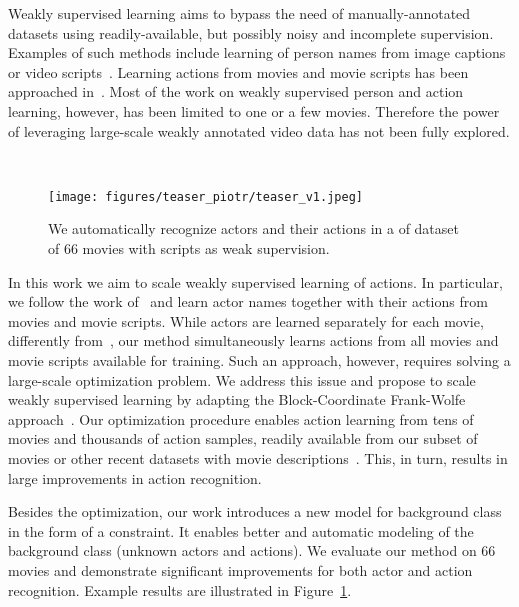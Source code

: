 \documentclass[10pt,twocolumn,letterpaper]{article}
\begin{document}
Weakly supervised learning aims to bypass the need of manually-annotated datasets using readily-available, but possibly noisy and incomplete supervision.
Examples of such methods include learning of person names from image captions or video scripts~\cite{berg2004names,everingham06hello,sivic09who,tapaswi12knock}.
Learning actions from movies and movie scripts has been approached in~\cite{bojanowski13finding,bojanowski14weakly,duchenne09automatic,laptev08learning}.
Most of the work on weakly supervised person and action learning, however, has been limited to one or a few movies. Therefore the power of leveraging large-scale weakly annotated
video data has not been fully explored.

\begin{figure}[t]
  \mbox{}\vspace{.3cm}\\
  \begin{center}
  \texttt{[image: figures/teaser\_piotr/teaser\_v1.jpeg]}
\end{center}
\caption{We automatically recognize actors and their actions in a of dataset of 66 movies with scripts as weak supervision.}
\label{fig:teaser}
\vspace{-.5cm}
\end{figure}

In this work we aim to scale weakly supervised learning of actions.
In particular, we follow the work of~\cite{bojanowski13finding} and learn actor names together with their actions from movies and movie scripts.
While actors are learned separately for each movie, differently from~\cite{bojanowski13finding}, our method simultaneously learns actions from all movies and movie scripts available for training.
Such an approach, however, requires solving a large-scale optimization problem.
We address this issue and propose to scale weakly supervised learning by adapting the Block-Coordinate Frank-Wolfe approach~\cite{lacoste13bcfw}.
Our optimization procedure enables action learning from tens of movies and thousands of action samples, readily available from our subset of movies or other recent datasets with movie descriptions~\cite{rohrbach15dataset}.
This, in turn, results in large improvements in action recognition.


Besides the optimization, our work introduces a new model for background class in the form of a constraint. It enables better and automatic modeling of the background class (\ie unknown actors and actions).
We evaluate our method on 66 movies and demonstrate  significant improvements for both actor and action recognition.
Example results are illustrated in Figure~\ref{fig:teaser}.
\end{document}
